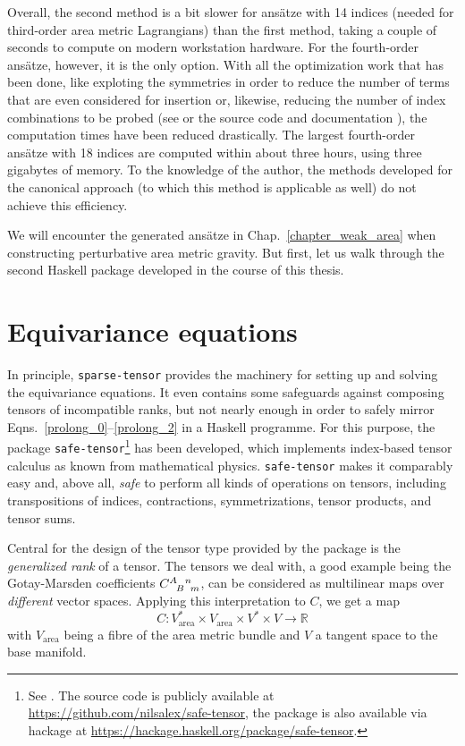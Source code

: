 Overall, the second method is a bit slower for ansätze with 14 indices (needed for third-order area metric Lagrangians) than the first method, taking a couple of seconds to compute on modern workstation hardware. For the fourth-order ansätze, however, it is the only option. With all the optimization work that has been done, like exploting the symmetries in order to reduce the number of terms that are even considered for insertion or, likewise, reducing the number of index combinations to be probed (see \cite{Reinhart_2019} or the source code and documentation \cite{Reinhart_2019_sparse-tensor}), the computation times have been reduced drastically. The largest fourth-order ansätze with 18 indices are computed within about three hours, using three gigabytes of memory. To the knowledge of the author, the methods developed for the canonical approach \cite{Schneider_2017} (to which this method is applicable as well) do not achieve this efficiency.

We will encounter the generated ansätze in Chap.~\ref{chapter_weak_area} when constructing perturbative area metric gravity. But first, let us walk through the second Haskell package developed in the course of this thesis.

\section{Equivariance equations}
In principle, \texttt{sparse-tensor} provides the machinery for setting up and solving the equivariance equations. It even contains some safeguards against composing tensors of incompatible ranks, but not nearly enough in order to safely mirror Eqns.\ \eqref{prolong_0}--\eqref{prolong_2} in a Haskell programme. For this purpose, the package \texttt{safe-tensor}\footnote{See \cite{Alex_2020_safe-tensor}. The source code is publicly available at \url{https://github.com/nilsalex/safe-tensor}, the package is also available via hackage at \url{https://hackage.haskell.org/package/safe-tensor}.} has been developed, which implements index-based tensor calculus as known from mathematical physics. \texttt{safe-tensor} makes it comparably easy and, above all, \emph{safe} to perform all kinds of operations on tensors, including transpositions of indices, contractions, symmetrizations, tensor products, and tensor sums.

Central for the design of the tensor type provided by the package is the \emph{generalized rank} of a tensor. The tensors we deal with, a good example being the Gotay-Marsden coefficients $\gmc{A}{B}{n}{m}$, can be considered as multilinear maps over \emph{different} vector spaces. Applying this interpretation to $C$, we get a map
\begin{equation}
  C \colon V_\text{area}^\ast \times V_\text{area} \times V^\ast \times V \rightarrow \mathbb R
\end{equation}
with $V_\text{area}$ being a fibre of the area metric bundle and $V$ a tangent space to the base manifold.

